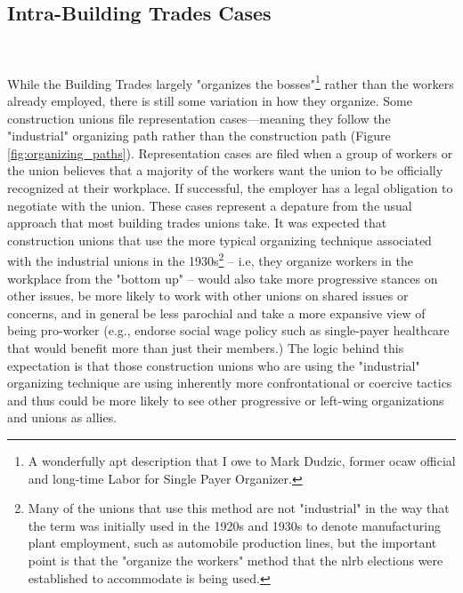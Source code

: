 \documentclass[12pt]{article}
\begin{document}
\subsection{Intra-Building Trades Cases} \

While the Building Trades largely "organizes the bosses"\footnote{A wonderfully apt description that I owe to Mark Dudzic, former \acrshort{ocaw} official and long-time Labor for Single Payer Organizer.} rather than the workers already employed, there is still some variation in how they organize. Some construction unions file representation cases---meaning they follow the "industrial" organizing path rather than the construction path (Figure \ref{fig:organizing_paths}). Representation cases are filed when a group of workers or the union believes that a majority of the workers want the union to be officially recognized at their workplace. If successful, the employer has a legal obligation to negotiate with the union. These cases represent a depature from the usual approach that most building trades unions take. It was expected that construction unions that use the more typical organizing technique associated with the industrial unions in the 1930s\footnote{Many of the unions that use this method are not "industrial" in the way that the term was initially used in the 1920s and 1930s to denote manufacturing plant employment, such as automobile production lines, but the important point is that the "organize the workers" method that the \acrshort{nlrb} elections were established to accommodate is being used.} -- i.e, they organize workers in the workplace from the "bottom up" -- would also take more progressive stances on other issues, be more likely to work with other unions on shared issues or concerns, and in general be less parochial and take a more expansive view of being pro-worker (e.g., endorse social wage policy such as single-payer healthcare that would benefit more than just their members.) The logic behind this expectation is that those construction unions who are using the "industrial" organizing technique are using inherently more confrontational or coercive tactics and thus could be more likely to see other progressive or left-wing organizations and unions as allies.
\end{document}
